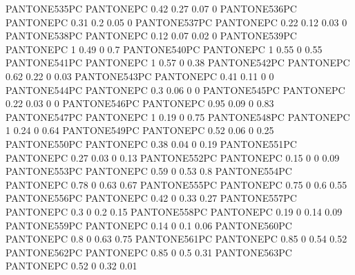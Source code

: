  {PANTONE535PC} {PANTONE\SpotSpace PC} {0.42 0.27 0.07 0}
 {PANTONE536PC} {PANTONE\SpotSpace PC} {0.31 0.2 0.05 0}
 {PANTONE537PC} {PANTONE\SpotSpace PC} {0.22 0.12 0.03 0}
 {PANTONE538PC} {PANTONE\SpotSpace PC} {0.12 0.07 0.02 0}
 {PANTONE539PC} {PANTONE\SpotSpace PC} {1 0.49 0 0.7}
 {PANTONE540PC} {PANTONE\SpotSpace PC} {1 0.55 0 0.55}
 {PANTONE541PC} {PANTONE\SpotSpace PC} {1 0.57 0 0.38}
 {PANTONE542PC} {PANTONE\SpotSpace PC} {0.62 0.22 0 0.03}
 {PANTONE543PC} {PANTONE\SpotSpace PC} {0.41 0.11 0 0}
 {PANTONE544PC} {PANTONE\SpotSpace PC} {0.3 0.06 0 0}
 {PANTONE545PC} {PANTONE\SpotSpace PC} {0.22 0.03 0 0}
 {PANTONE546PC} {PANTONE\SpotSpace PC} {0.95 0.09 0 0.83}
 {PANTONE547PC} {PANTONE\SpotSpace PC} {1 0.19 0 0.75}
 {PANTONE548PC} {PANTONE\SpotSpace PC} {1 0.24 0 0.64}
 {PANTONE549PC} {PANTONE\SpotSpace PC} {0.52 0.06 0 0.25}
 {PANTONE550PC} {PANTONE\SpotSpace PC} {0.38 0.04 0 0.19}
 {PANTONE551PC} {PANTONE\SpotSpace PC} {0.27 0.03 0 0.13}
 {PANTONE552PC} {PANTONE\SpotSpace PC} {0.15 0 0 0.09}
 {PANTONE553PC} {PANTONE\SpotSpace PC} {0.59 0 0.53 0.8}
 {PANTONE554PC} {PANTONE\SpotSpace PC} {0.78 0 0.63 0.67}
 {PANTONE555PC} {PANTONE\SpotSpace PC} {0.75 0 0.6 0.55}
 {PANTONE556PC} {PANTONE\SpotSpace PC} {0.42 0 0.33 0.27}
 {PANTONE557PC} {PANTONE\SpotSpace PC} {0.3 0 0.2 0.15}
 {PANTONE558PC} {PANTONE\SpotSpace PC} {0.19 0 0.14 0.09}
 {PANTONE559PC} {PANTONE\SpotSpace PC} {0.14 0 0.1 0.06}
 {PANTONE560PC} {PANTONE\SpotSpace PC} {0.8 0 0.63 0.75}
 {PANTONE561PC} {PANTONE\SpotSpace PC} {0.85 0 0.54 0.52}
 {PANTONE562PC} {PANTONE\SpotSpace PC} {0.85 0 0.5 0.31}
 {PANTONE563PC} {PANTONE\SpotSpace PC} {0.52 0 0.32 0.01}
